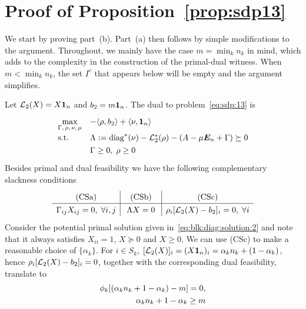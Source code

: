 \section{Proof of Proposition~\ref{prop:sdp13}}

  We start by proving part~(b). Part~(a) then follows by simple modifications to the argument. Throughout, we mainly have the case $m = \min_k n_k$ in mind, which adds to the complexity in the construction of the primal-dual witness. When $m < \min_k n_k$, the set $I^c$ that appears below will be empty and the argument simplifies.

  Let $\mathcal{L}_2(X) = X \bm{1}_n$ and $b_2 = m\bm{1}_n$. The dual to problem~\eqref{eq:sdp:13} is
  \begin{align*}
    \renewcommand{\arraystretch}{1.3}
    \begin{array}{ll}
      \max\limits_{\Gamma,\,\rho,\,\nu,\,\mu} & - \ip{\rho,b_2} + \ip{\nu,\onev_n} \\
      \text{s.t.} & \Lambda :=  \diag^*(\nu) - \Lc_2^*(\rho) - (A-\mu \onem_n +\Gamma) \succeq 0 \\
      & \Gamma \ge 0, \; \rho \ge 0
    \end{array}
  \end{align*}
  Besides primal and dual feasibility we have the following complementary slackness conditions
  \begin{align*}
    \renewcommand{\arraystretch}{1.3}
    \begin{array}{c|c|c}
      \text{(CSa)} & \text{(CSb)} & \text{(CSc)}\\
      \hline
      \Gamma_{ij} X_{ij} = 0, \;\forall i,j & \; \Lambda X = 0 \; &\rho_i [\Lc_2(X) - b_2 ]_i = 0, \;\forall i
    \end{array}
  \end{align*}
  Consider the potential primal solution given in~\eqref{eq:blk:diag:solution:2} and note that it always satisfies $X_{ii} = 1$, $X \succeq 0$ and $X \ge 0$. We can use (CSc) to make a reasonable choice of $\{\alpha_k\}$.
  For $i \in S_k$, $[\mathcal{L}_2(X)]_i = (X \bm{1}_n)_i =  \alpha_k n_k + (1-\alpha_k)$, hence $\rho_i [\mathcal{L}_2(X) - b_2 ]_i = 0$, together with the corresponding dual feasibility, translate to 
  \begin{align}\label{SDP13:CS:phi:alpha}
    \phi_k [ (\alpha_k n_k  + 1-\alpha_k) - m] = 0, \\
      \alpha_k n_k  + 1-\alpha_k \ge m
  \end{align}

